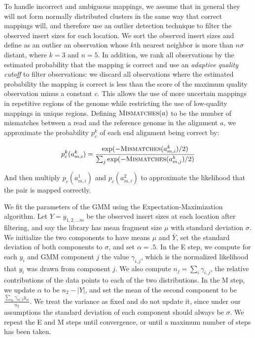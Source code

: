 \documentclass[11pt]{article}
\begin{document}
\begin{description}
To handle incorrect and ambiguous mappings, we assume that in general they will not form normally distributed clusters in the same way that correct mappings will, and therefore use an outlier detection technique to filter the observed insert sizes for each location. We sort the observed insert sizes and define as an outlier an observation whose $k$th nearest neighbor is more than $n\sigma$ distant, where $k = 3$ and $n = 5$. In addition, we rank all observations by the estimated probability that the mapping is correct and use an \emph{adaptive quality cutoff} to filter observations: we discard all observations where the estimated probability the mapping is correct is less than the score of the maximum quality observation minus a constant $c$. This allows the use of more uncertain mappings in repetitive regions of the genome while restricting the use of low-quality mappings in unique regions. Defining $\textsc{Mismatches}(a)$ to be the number of mismatches between a read and the reference genome in the alignment $a$, we approximate the probability $p^{k}_c$ of each end alignment being correct by:

\[ p^{k}_c(a^{k}_{m,i}) = \frac{\exp({-\textsc{Mismatches}(a^{k}_{m,i})/2)}}{\sum_j{\exp(-\textsc{Mismatches}(a^{k}_{m,j})/2)}} \]

And then multiply $p_c(a^{1}_{m,i})$ and $p_c(a^{2}_{m,i})$ to approximate the likelihood that the pair is mapped correctly.

We fit the parameters of the GMM using the Expectation-Maximization algorithm. Let $Y = y_{1,2, \ldots m}$ be the observed insert sizes at each location after filtering, and say the library has mean fragment size $\mu$ with standard deviation $\sigma$. We initialize the two components to have means $\mu$ and $\bar{Y}$, set the standard deviation of both components to $\sigma$, and set $\alpha = .5$. In the E step, we compute for each $y_i$ and GMM component $j$ the value $\gamma_{i,j}$, which is the normalized likelihood that $y_i$ was drawn from component $j$. We also compute $n_j = \sum_i{\gamma_{i,j}}$, the relative contributions of the data points to each of the two distributions. In the M step, we update $\alpha$ to be $n_2 - \left|Y\right|$, and set the mean of the second component to be $\frac{\sum_m{\gamma_{m,2}y_m}}{n_2}$. We treat the variance as fixed and do not update it, since under our assumptions the standard deviation of each component should always be $\sigma$. We repeat the E and M steps until convergence, or until a maximum number of steps has been taken.


\end{description}
\end{document}
